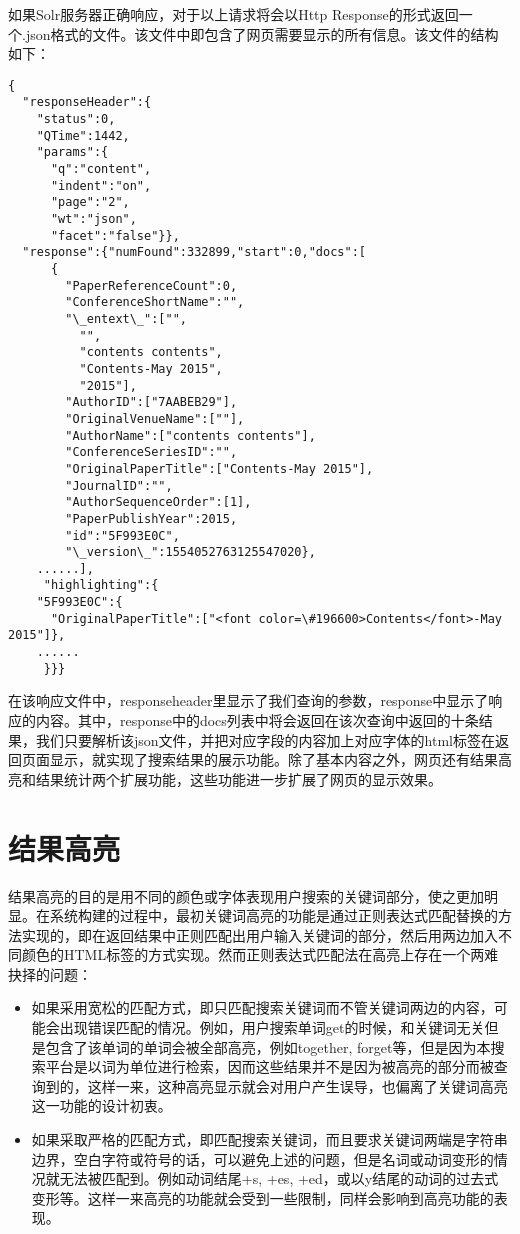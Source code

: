 如果Solr服务器正确响应，对于以上请求将会以Http Response的形式返回一个.json格式的文件。该文件中即包含了网页需要显示的所有信息。该文件的结构如下：

\begin{lstlisting}[caption={返回文件格式}, label=returnfileformat, escapeinside="", numbers=none]
{
  "responseHeader":{
    "status":0,
    "QTime":1442,
    "params":{
      "q":"content",
      "indent":"on",
      "page":"2",
      "wt":"json",
      "facet":"false"}},
  "response":{"numFound":332899,"start":0,"docs":[
      {
        "PaperReferenceCount":0,
        "ConferenceShortName":"",
        "\_entext\_":["",
          "",
          "contents contents",
          "Contents-May 2015",
          "2015"],
        "AuthorID":["7AABEB29"],
        "OriginalVenueName":[""],
        "AuthorName":["contents contents"],
        "ConferenceSeriesID":"",
        "OriginalPaperTitle":["Contents-May 2015"],
        "JournalID":"",
        "AuthorSequenceOrder":[1],
        "PaperPublishYear":2015,
        "id":"5F993E0C",
        "\_version\_":1554052763125547020},
    ......],
     "highlighting":{
    "5F993E0C":{
      "OriginalPaperTitle":["<font color=\#196600>Contents</font>-May 2015"]},
    ......
     }}}
\end{lstlisting}

在该响应文件中，responseheader里显示了我们查询的参数，response中显示了响应的内容。其中，response中的docs列表中将会返回在该次查询中返回的十条结果，我们只要解析该json文件，并把对应字段的内容加上对应字体的html标签在返回页面显示，就实现了搜索结果的展示功能。除了基本内容之外，网页还有结果高亮和结果统计两个扩展功能，这些功能进一步扩展了网页的显示效果。
\section{结果高亮}
结果高亮的目的是用不同的颜色或字体表现用户搜索的关键词部分，使之更加明显。在系统构建的过程中，最初关键词高亮的功能是通过正则表达式匹配替换的方法实现的，即在返回结果中正则匹配出用户输入关键词的部分，然后用两边加入不同颜色的HTML标签的方式实现。然而正则表达式匹配法在高亮上存在一个两难抉择的问题：

\begin{itemize}
\item 如果采用宽松的匹配方式，即只匹配搜索关键词而不管关键词两边的内容，可能会出现错误匹配的情况。例如，用户搜索单词get的时候，和关键词无关但是包含了该单词的单词会被全部高亮，例如together, forget等，但是因为本搜索平台是以词为单位进行检索，因而这些结果并不是因为被高亮的部分而被查询到的，这样一来，这种高亮显示就会对用户产生误导，也偏离了关键词高亮这一功能的设计初衷。
\item 如果采取严格的匹配方式，即匹配搜索关键词，而且要求关键词两端是字符串边界，空白字符或符号的话，可以避免上述的问题，但是名词或动词变形的情况就无法被匹配到。例如动词结尾+s, +es, +ed，或以y结尾的动词的过去式变形等。这样一来高亮的功能就会受到一些限制，同样会影响到高亮功能的表现。
\end{itemize}


